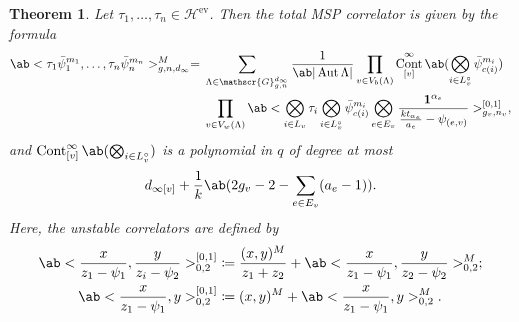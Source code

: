 \documentclass[10pt]{amsart}
\newtheorem{thm}{Theorem}[section]
\theoremstyle{definition}
\theoremstyle{remark}
\theoremstyle{plain}
\theoremstyle{definition}
\theoremstyle{remark}
\newcommand{\msc}[1]{\mathscr{#1}}
\newcommand{\1}{\mathbf{1}}
\newcommand{\2}{\mathbf{2}}
\newcommand{\3}{\mathbf{3}}
\DeclareMathOperator{\Aut}{Aut}
\DeclareMathOperator{\ev}{ev}
\DeclareMathOperator{\Cont}{Cont}
\numberwithin{equation}{section}
\begin{document}
\begin{thm}\label{thm:decomposition}
    Let $\tau_1, \ldots, \tau_n \in \msc{H}^{\ev}$. Then the total MSP correlator is given by the formula
    \begin{align*}
        \ab<\tau_1\bar{\psi}_1^{m_1}, \ldots, \tau_n \bar{\psi}_n^{m_n}>_{g,n,d_{\infty}}^M ={}& \sum_{\Lambda \in \msc{G}_{g,n}^{d_{\infty}}} \frac{1}{\ab|\Aut \Lambda|} \prod_{v \in V_b(\Lambda)} \Cont_{[v]}^{\infty}\ab(\bigotimes_{i \in L_v^{\circ}} \bar{\psi}_{c(i)}^{m_i}) \\
        &\prod_{v \in V_w(\Lambda)} \ab<\bigotimes_{i \in L_v} \tau_i \bigotimes_{i \in L_v^{\circ}} \bar{\psi}_{c(i)}^{m_i} \bigotimes_{e \in E_v} \frac{\1^{\alpha_e}}{\frac{k t_{\alpha_e}}{a_e} - \psi_{ (e,v) }}>_{g_v, n_v}^{[0,1]},
    \end{align*}
    and $\Cont_{[v]}^{\infty}\ab(\bigotimes_{i \in L_v^{\circ}})$ is a polynomial in $q$ of degree at most
    \[ d_{\infty[v]} + \frac{1}{k}\ab(2g_v-2-\sum_{e \in E_v}(a_e-1)). \]
    Here, the unstable correlators are defined by
    \begin{align}
        \ab<\frac{x}{z_1 - \psi_1}, \frac{y}{z_i-\psi_2}>_{0,2}^{[0,1]} &\coloneqq \frac{(x,y)^M}{z_1+z_2} + \ab<\frac{x}{z_1 - \psi_1}, \frac{y}{z_2-\psi_2}>_{0,2}^{M}; \label{eqn:01twodescendents} \\
        \ab<\frac{x}{z_1 - \psi_1}, y>_{0,2}^{[0,1]} &\coloneqq (x,y)^M + \ab<\frac{x}{z_1 - \psi_1}, y>_{0,2}^{M} \label{eqn:01onedescendent} .
    \end{align}
\end{thm}
\end{document}
